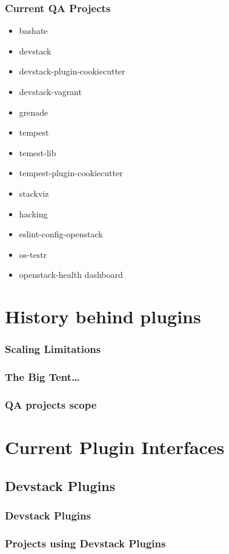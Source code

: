 \documentclass[aspectratio=169,11pt,hyperref={colorlinks=true}]{beamer}
\begin{document}
\begin{frame}
    \frametitle{Current QA Projects}
    \begin{itemize}
    \item{bashate}
    \item{devstack}
    \item{devstack-plugin-cookiecutter}
    \item{devstack-vagrant}
    \item{grenade}
    \item{tempest}
    \item{temest-lib}
    \item{tempest-plugin-cookiecutter}
    \item{stackviz}
    \item{hacking}
    \item{eslint-config-openstack}
    \item{os-testr}
    \item{openstack-health dashboard}
    \end{itemize}
\end{frame}

\section{History behind plugins}
\begin{frame}
\frametitle{Scaling Limitations}
\end{frame}

\begin{frame}
    \frametitle{The Big Tent\ldots}
\end{frame}

\begin{frame}
    \frametitle{QA projects scope}

\end{frame}

\section{Current Plugin Interfaces}
\subsection{Devstack Plugins}
\begin{frame}
\frametitle{Devstack Plugins}
\end{frame}

\begin{frame}
    \frametitle{Projects using Devstack Plugins}
\end{frame}
\end{document}
